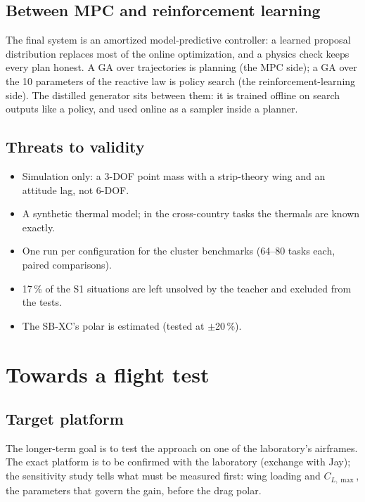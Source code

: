 \documentclass[11pt,a4paper,oneside]{report}
\newcommand{\CLmax}{C_{L,\max}}
\begin{document}
\section{Between MPC and reinforcement learning}
The final system is an amortized model-predictive controller: a learned proposal distribution replaces most of the online optimization, and a physics check keeps every plan honest. A GA over trajectories is planning (the MPC side); a GA over the 10 parameters of the reactive law is policy search (the reinforcement-learning side). The distilled generator sits between them: it is trained offline on search outputs like a policy, and used online as a sampler inside a planner.

\section{Threats to validity}
\begin{itemize}
  \item Simulation only: a 3-DOF point mass with a strip-theory wing and an attitude lag, not 6-DOF.
  \item A synthetic thermal model; in the cross-country tasks the thermals are known exactly.
  \item One run per configuration for the cluster benchmarks (64--80 tasks each, paired comparisons).
  \item 17\,\% of the S1 situations are left unsolved by the teacher and excluded from the tests.
  \item The SB-XC's polar is estimated (tested at $\pm$20\,\%).
\end{itemize}

\chapter{Towards a flight test}\label{ch:towards}

\section{Target platform}
The longer-term goal is to test the approach on one of the laboratory's airframes. The exact platform is to be confirmed with the laboratory (exchange with Jay); the sensitivity study tells what must be measured first: wing loading and $\CLmax$, the parameters that govern the gain, before the drag polar.
\end{document}
